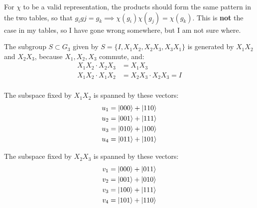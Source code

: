 \documentclass[12pt]{extarticle}
\begin{document}
For $\chi$ to be a valid representation, the products should form the same pattern in the two tables, so that $g_igj = g_k \implies \chi(g_i)\chi(g_j) = \chi(g_k)$.
This is \textbf{not} the case in my tables, so I have gone wrong somewhere, but I am not sure where.




The subgroup $S\subset G_3$ given by $S = \{I, X_1X_2, X_2X_3, X_3X_1\}$ is generated by $X_1X_2$ and $X_2X_3$,
because $X_1, X_2, X_3$ commute, and:
\begin{align*}
X_1X_2 \cdot X_2X_3 & = X_1X_3 \\
X_1X_2 \cdot X_1X_2 & = X_2X_3 \cdot X_2X_3 = I \\
\end{align*}

The subspace fixed by $X_1X_2$ is spanned by these vectors:
\begin{align*}
u_1 & = \ket{000} + \ket{110} \\
u_2 & = \ket{001} + \ket{111} \\
u_3 & = \ket{010} + \ket{100} \\
u_4 & = \ket{011} + \ket{101} \\
\end{align*}

The subspace fixed by $X_2X_3$ is spanned by these vectors:
\begin{align*}
v_1 & = \ket{000} + \ket{011} \\
v_2 & = \ket{001} + \ket{010} \\
v_3 & = \ket{100} + \ket{111} \\
v_4 & = \ket{101} + \ket{110} \\
\end{align*}
\end{document}
